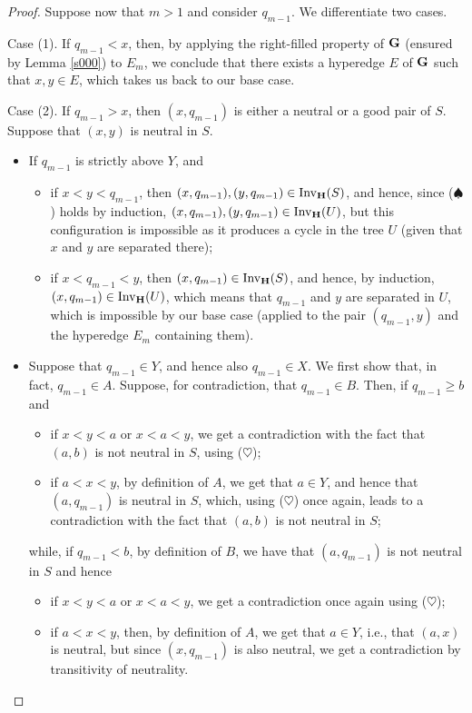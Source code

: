 \documentclass{article}
\theoremstyle{plain}
\theoremstyle{definition}
\newcommand{\Inv}{{\mathrm{Inv}}}
\begin{document}
\begin{proof}
\smallskip

Suppose now that $m>1$ and consider $q_{m-1}$. We differentiate two cases.
 
\smallskip
\indent Case (1). If $q_{m-1}<x$, then, by applying the right-filled property of ${\bf G}$ (ensured by Lemma \ref{s000}) to $E_{m}$, we conclude that there exists a hyperedge $E$ of ${\bf G}$ such that $x,y\in E$, which takes us back to our base case.


 
\smallskip

 
\indent Case (2). If $q_{m-1}>x$, then $(x,q_{m-1})$ is either a neutral or a good pair of $S$. Suppose that $(x,y)$ is neutral in $S$.
\begin{itemize}
\item If $q_{m-1}$ is strictly above $Y$, and
\begin{itemize}
\item if $x<y<q_{m-1}$, then $(x,q_{m-1}),(y,q_{m-1})\in \Inv_{\bf H}(S)$, and hence, since ($\spadesuit$) holds by induction, $(x,q_{m-1}),(y,q_{m-1})\in \Inv_{\bf H}(U)$, but this configuration is impossible as it produces a cycle in the tree $U$ (given that $x$ and $y$ are separated there);
\item if $x<q_{m-1}<y$, then $(x,q_{m-1})\in \Inv_{\bf H}(S)$, and hence, by induction, $(x,q_{m-1})\in \Inv_{\bf H}(U)$, which means that $q_{m-1}$ and $y$ are separated in $U$, which is impossible by our base case (applied to the pair $(q_{m-1},y)$ and the hyperedge $E_m$ containing them).
\end{itemize}


\item Suppose that $q_{m-1}\in Y$, and hence also $q_{m-1}\in X$. We first show that, in fact, $q_{m-1}\in A$. Suppose, for contradiction, that $q_{m-1}\in B$. Then, if $q_{m-1}\geq b$ and
\begin{itemize}
\item if $x<y<a$ or $x<a<y$, we get a contradiction with the fact that $(a,b)$ is not neutral in $S$, using ($\heartsuit$);
\item if $a<x<y$, by definition of $A$, we get that $a\in Y$, and hence that $(a,q_{m-1})$ is neutral in $S$, which, using ($\heartsuit$) once again, leads to a contradiction with the fact that $(a,b)$ is not neutral in $S$;
\end{itemize}
while, if $q_{m-1}< b$, by definition of $B$, we have that $(a,q_{m-1})$ is not neutral in $S$ and hence
\begin{itemize}
\item if $x<y<a$ or $x<a<y$, we get a contradiction once again using ($\heartsuit$);
\item if $a<x<y$, then, by definition of $A$, we get that $a\in Y$, i.e., that $(a,x)$ is neutral, but since $(x,q_{m-1})$ is also neutral, we get a contradiction by transitivity of neutrality. 
\end{itemize}


\end{itemize}
\end{proof}
\end{document}

